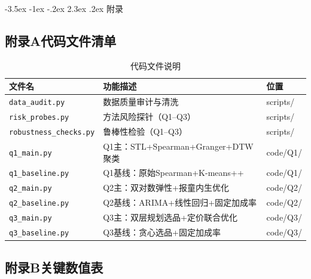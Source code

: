 \documentclass[12pt,a4paper]{article}
\makeatletter
\renewcommand{\section}{\@startsection{section}{1}{\z@}%
  {-3.5ex \@plus -1ex \@minus -.2ex}%
  {2.3ex \@plus.2ex}%
  {\centering\normalfont\Large\bfseries}}
\makeatother
\begin{document}
\newpage
\section{附\quad 录}

\subsection*{附录A\quad 代码文件清单}

\begin{table}[H]
\centering
\small
\begin{tabular}{p{3.5cm}p{6cm}p{2.5cm}}
\toprule
文件名 & 功能描述 & 位置 \\
\midrule
\texttt{data\_audit.py} & 数据质量审计与清洗 & scripts/ \\
\texttt{risk\_probes.py} & 方法风险探针（Q1--Q3） & scripts/ \\
\texttt{robustness\_checks.py} & 鲁棒性检验（Q1--Q3） & scripts/ \\
\texttt{q1\_main.py} & Q1主：STL+Spearman+Granger+DTW聚类 & code/Q1/ \\
\texttt{q1\_baseline.py} & Q1基线：原始Spearman+K-means++ & code/Q1/ \\
\texttt{q2\_main.py} & Q2主：双对数弹性+报童内生优化 & code/Q2/ \\
\texttt{q2\_baseline.py} & Q2基线：ARIMA+线性回归+固定加成率 & code/Q2/ \\
\texttt{q3\_main.py} & Q3主：双层规划选品+定价联合优化 & code/Q3/ \\
\texttt{q3\_baseline.py} & Q3基线：贪心选品+固定加成率 & code/Q3/ \\
\bottomrule
\end{tabular}
\caption{代码文件说明}
\end{table}

\subsection*{附录B\quad 关键数值表}
\end{document}
